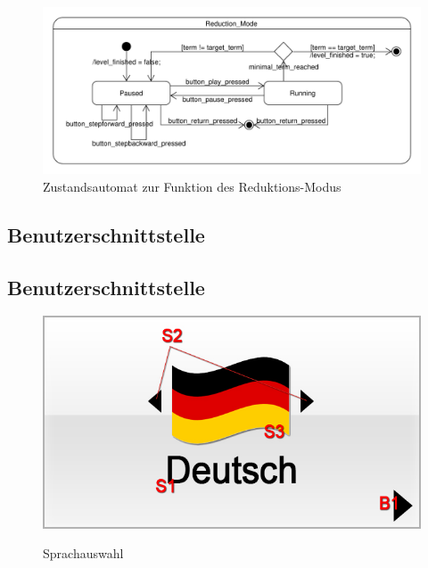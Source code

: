 \begin{figure}[H]
\centering
\includegraphics[scale=0.55]{../system_models/dynamic_models/reduction_mode_state_machine.pdf}
\caption{Zustandsautomat zur Funktion des Reduktions-Modus}
\end{figure}

\subsection{Benutzerschnittstelle}


\subsection{Benutzerschnittstelle}
\begin{figure}[H]

\centering
{}\label{fig:Sprachauswahl}
\includegraphics[scale=0.55]{../GUI-Entwurf/_jpeg_numeration/registration1.jpg}

\caption{Sprachauswahl}


\end{figure}

